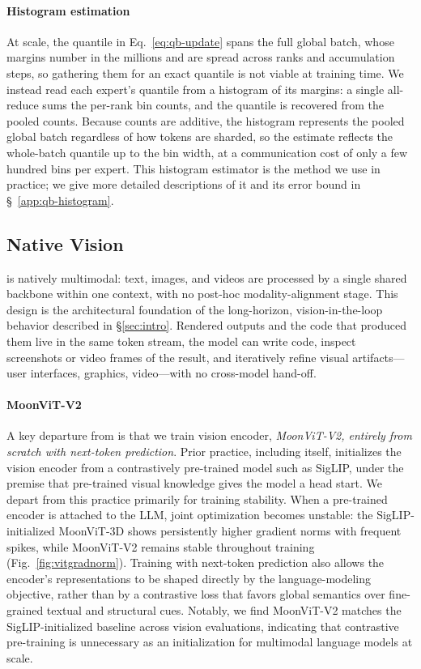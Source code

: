 \paragraph{Histogram estimation}
At scale, the quantile in Eq.~\ref{eq:qb-update} spans the full global batch, whose margins number in the millions and are spread across ranks and accumulation steps, so gathering them for an exact quantile is not viable at training time.
We instead read each expert's quantile from a histogram of its margins: a single all-reduce sums the per-rank bin counts, and the quantile is recovered from the pooled counts.
Because counts are additive, the histogram represents the pooled global batch regardless of how tokens are sharded, so the estimate reflects the whole-batch quantile up to the bin width, at a communication cost of only a few hundred bins per expert.
This histogram estimator is the method we use in practice; we give more detailed descriptions of it and its error bound in \S~\ref{app:qb-histogram}.


\subsection{Native Vision}
\label{sec:native-vision}

 is natively multimodal: text, images, and videos are processed by a single shared backbone within one context, with no post-hoc modality-alignment stage.
This design is the architectural foundation of the long-horizon, vision-in-the-loop behavior described in \S\ref{sec:intro}. Rendered outputs and the code that produced them live in the same token stream, the model can write code, inspect screenshots or video frames of the result, and iteratively refine visual artifacts---user interfaces, graphics, video---with no cross-model hand-off.

\paragraph{MoonViT-V2}
A key departure from  is that we train  vision encoder, \emph{MoonViT-V2, entirely from scratch with next-token prediction}.
Prior practice, including  itself, initializes the vision encoder from a contrastively pre-trained model such as SigLIP, under the premise that pre-trained visual knowledge gives the model a head start.
We depart from this practice primarily for training stability.
When a pre-trained encoder is attached to the LLM, joint optimization becomes unstable: the SigLIP-initialized MoonViT-3D shows persistently higher gradient norms with frequent spikes, while MoonViT-V2 remains stable throughout training (Fig.~\ref{fig:vitgradnorm}).
Training with next-token prediction also allows the encoder's representations to be shaped directly by the language-modeling objective, rather than by a contrastive loss that favors global semantics over fine-grained textual and structural cues.
Notably, we find MoonViT-V2 matches the SigLIP-initialized baseline across vision evaluations, indicating that contrastive pre-training is unnecessary as an initialization for multimodal language models at scale.



